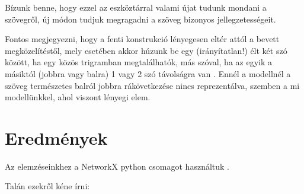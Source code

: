 \documentclass{llncs}
\newcommand{\nyil}{$\rightarrow$\ }
\newcommand{\embf}[1]{\textbf{#1}}
\newcommand{\XXX}[1]{{\small \color{megjcolor} [XXX #1]}}
\newcommand{\XXXb}[1]{\XXX{\embf{#1}}}
\begin{document}
Bízunk benne, hogy ezzel az eszköztárral
valami újat tudunk mondani a szövegről,
új módon tudjuk megragadni a szöveg bizonyos jellegzetességeit.

Fontos megjegyezni, hogy a fenti konstrukció lényegesen eltér
attól a bevett megközelítéstől,
mely esetében akkor húzunk be egy (irányítatlan!) élt
két szó között, ha egy közös trigramban megtalálhatók,
más szóval, ha az egyik a másiktól (jobbra vagy balra)
1 vagy 2 szó távolságra van
\cite{cancho2001thesmall}.
Ennél a modellnél a szöveg természetes balról jobbra rákövetkezése
nincs reprezentálva,
szemben a mi modellünkkel, ahol viszont lényegi elem.


\newpage %

\section{Eredmények}

Az elemzéseinkhez a NetworkX python csomagot használtuk
\cite{hagberg2008exploring}.

Talán ezekről kéne írni:
\end{document}
